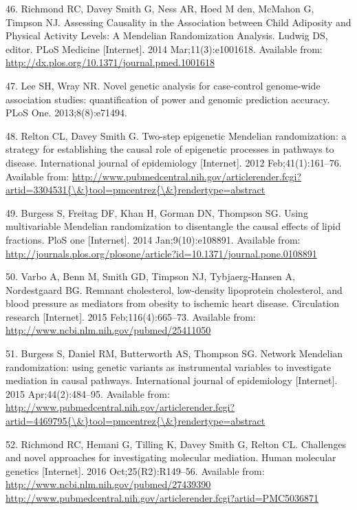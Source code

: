 \documentclass[]{article}
\begin{document}
\hypertarget{ref-Richmond2014}{}
46. Richmond RC, Davey Smith G, Ness AR, Hoed M den, McMahon G, Timpson
NJ. Assessing Causality in the Association between Child Adiposity and
Physical Activity Levels: A Mendelian Randomization Analysis. Ludwig DS,
editor. PLoS Medicine {[}Internet{]}. 2014 Mar;11(3):e1001618. Available
from: \url{http://dx.plos.org/10.1371/journal.pmed.1001618}

\hypertarget{ref-Lee2013c}{}
47. Lee SH, Wray NR. Novel genetic analysis for case-control genome-wide
association studies: quantification of power and genomic prediction
accuracy. PLoS One. 2013;8(8):e71494.

\hypertarget{ref-Relton2012}{}
48. Relton CL, Davey Smith G. Two-step epigenetic Mendelian
randomization: a strategy for establishing the causal role of epigenetic
processes in pathways to disease. International journal of epidemiology
{[}Internet{]}. 2012 Feb;41(1):161--76. Available from:
\href{http://www.pubmedcentral.nih.gov/articlerender.fcgi?artid=3304531\%7B/\&\%7Dtool=pmcentrez\%7B/\&\%7Drendertype=abstract}{http://www.pubmedcentral.nih.gov/articlerender.fcgi?artid=3304531\{\textbackslash{}\&\}tool=pmcentrez\{\textbackslash{}\&\}rendertype=abstract}

\hypertarget{ref-Burgess2014a}{}
49. Burgess S, Freitag DF, Khan H, Gorman DN, Thompson SG. Using
multivariable Mendelian randomization to disentangle the causal effects
of lipid fractions. PloS one {[}Internet{]}. 2014 Jan;9(10):e108891.
Available from:
\url{http://journals.plos.org/plosone/article?id=10.1371/journal.pone.0108891}

\hypertarget{ref-Varbo2015}{}
50. Varbo A, Benn M, Smith GD, Timpson NJ, Tybjaerg-Hansen A,
Nordestgaard BG. Remnant cholesterol, low-density lipoprotein
cholesterol, and blood pressure as mediators from obesity to ischemic
heart disease. Circulation research {[}Internet{]}. 2015
Feb;116(4):665--73. Available from:
\url{http://www.ncbi.nlm.nih.gov/pubmed/25411050}

\hypertarget{ref-Burgess2015}{}
51. Burgess S, Daniel RM, Butterworth AS, Thompson SG. Network Mendelian
randomization: using genetic variants as instrumental variables to
investigate mediation in causal pathways. International journal of
epidemiology {[}Internet{]}. 2015 Apr;44(2):484--95. Available from:
\href{http://www.pubmedcentral.nih.gov/articlerender.fcgi?artid=4469795\%7B/\&\%7Dtool=pmcentrez\%7B/\&\%7Drendertype=abstract}{http://www.pubmedcentral.nih.gov/articlerender.fcgi?artid=4469795\{\textbackslash{}\&\}tool=pmcentrez\{\textbackslash{}\&\}rendertype=abstract}

\hypertarget{ref-Richmond2016}{}
52. Richmond RC, Hemani G, Tilling K, Davey Smith G, Relton CL.
Challenges and novel approaches for investigating molecular mediation.
Human molecular genetics {[}Internet{]}. 2016 Oct;25(R2):R149--56.
Available from:
\href{http://www.ncbi.nlm.nih.gov/pubmed/27439390\%20http://www.pubmedcentral.nih.gov/articlerender.fcgi?artid=PMC5036871}{http://www.ncbi.nlm.nih.gov/pubmed/27439390 http://www.pubmedcentral.nih.gov/articlerender.fcgi?artid=PMC5036871}
\end{document}
